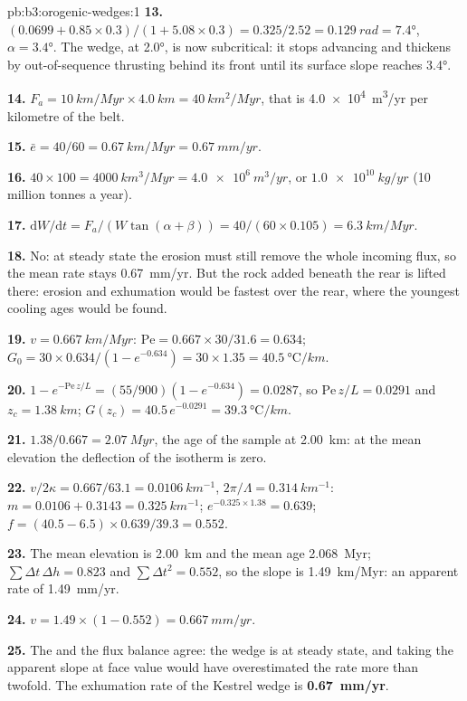 \begin{solution}{pb:b3:orogenic-wedges:1}
\textbf{13.} $(0.0699 + 0.85\times0.3)/(1 + 5.08\times0.3) = 0.325/2.52 =
\qty{0.129}{rad} = \ang{7.4}$, $\alpha = \ang{3.4}$. The wedge, at \ang{2.0},
is now subcritical: it stops advancing and thickens by out-of-sequence
thrusting behind its front until its surface slope reaches \ang{3.4}.

\textbf{14.} $F_a = \qty{10}{km/Myr}\times\qty{4.0}{km} = \qty{40}{km^2/Myr}$,
that is \qty{4.0e4}{m^3/yr} per kilometre of the belt.

\textbf{15.} $\bar e = 40/60 = \qty{0.67}{km/Myr} = \qty{0.67}{mm/yr}$.

\textbf{16.} $40\times100 = \qty{4000}{km^3/Myr} = \qty{4.0e6}{m^3/yr}$, or
$\qty{1.0e10}{kg/yr}$ (10 million tonnes a year).

\textbf{17.} $\mathrm dW/\mathrm dt = F_a/(W\tan(\alpha + \beta)) =
40/(60\times0.105) = \qty{6.3}{km/Myr}$.

\textbf{18.} No: at steady state the erosion must still remove the whole
incoming flux, so the mean rate stays \qty{0.67}{mm/yr}. But the rock added
beneath the rear is lifted there: erosion and exhumation would be fastest
over the rear, where the youngest cooling ages would be found.

\textbf{19.} $v = \qty{0.667}{km/Myr}$: $\mathrm{Pe} = 0.667\times30/31.6 =
0.634$; $G_0 = 30\times0.634/(1 - e^{-0.634}) = 30\times1.35 =
\qty{40.5}{\celsius/km}$.

\textbf{20.} $1 - e^{-\mathrm{Pe}\,z/L} = (55/900)(1 - e^{-0.634}) = 0.0287$,
so $\mathrm{Pe}\,z/L = 0.0291$ and $z_c = \qty{1.38}{km}$; $G(z_c) =
40.5\,e^{-0.0291} = \qty{39.3}{\celsius/km}$.

\textbf{21.} $1.38/0.667 = \qty{2.07}{Myr}$, the age of the sample at
\qty{2.00}{km}: at the mean elevation the deflection of the isotherm is zero.

\textbf{22.} $v/2\kappa = 0.667/63.1 = \qty{0.0106}{km^{-1}}$, $2\pi/\Lambda =
\qty{0.314}{km^{-1}}$: $m = 0.0106 + 0.3143 = \qty{0.325}{km^{-1}}$;
$e^{-0.325\times1.38} = 0.639$; $f = (40.5 - 6.5)\times0.639/39.3 = 0.552$.

\textbf{23.} The mean elevation is \qty{2.00}{km} and the mean age
\qty{2.068}{Myr}; $\sum\Delta t\,\Delta h = 0.823$ and $\sum\Delta t^2 =
0.552$, so the slope is \qty{1.49}{km/Myr}: an apparent rate of
\qty{1.49}{mm/yr}.

\textbf{24.} $v = 1.49\times(1 - 0.552) = \qty{0.667}{mm/yr}$.

\textbf{25.} The  and the flux balance agree: the wedge is
at steady state, and taking the apparent slope at face value would have
overestimated the rate more than twofold. The exhumation rate of the Kestrel
wedge is \textbf{\qty[text-series-to-math=true]{0.67}{mm/yr}}.
\end{solution}
